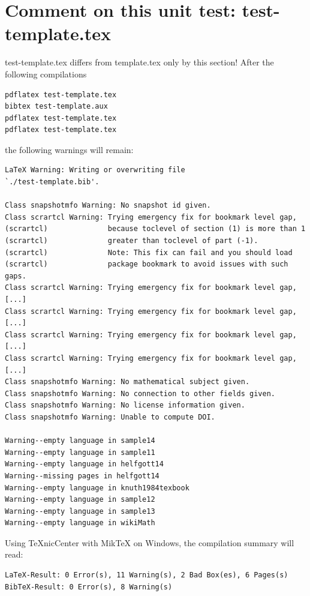 \documentclass{snapshotmfo}
\begin{document}
\section{Comment on this unit test: test-template.tex}
test-template.tex differs from template.tex only by this section!
After the following compilations
\begin{small}
\begin{verbatim}
pdflatex test-template.tex
bibtex test-template.aux
pdflatex test-template.tex
pdflatex test-template.tex
\end{verbatim}
\end{small}
the following warnings will remain:
\begin{small}
\begin{verbatim}
LaTeX Warning: Writing or overwriting file
`./test-template.bib'.

Class snapshotmfo Warning: No snapshot id given.
Class scrartcl Warning: Trying emergency fix for bookmark level gap,
(scrartcl)              because toclevel of section (1) is more than 1
(scrartcl)              greater than toclevel of part (-1).
(scrartcl)              Note: This fix can fail and you should load
(scrartcl)              package bookmark to avoid issues with such gaps.
Class scrartcl Warning: Trying emergency fix for bookmark level gap,
[...]
Class scrartcl Warning: Trying emergency fix for bookmark level gap,
[...]
Class scrartcl Warning: Trying emergency fix for bookmark level gap,
[...]
Class scrartcl Warning: Trying emergency fix for bookmark level gap,
[...]
Class snapshotmfo Warning: No mathematical subject given.
Class snapshotmfo Warning: No connection to other fields given.
Class snapshotmfo Warning: No license information given.
Class snapshotmfo Warning: Unable to compute DOI.

Warning--empty language in sample14
Warning--empty language in sample11
Warning--empty language in helfgott14
Warning--missing pages in helfgott14
Warning--empty language in knuth1984texbook
Warning--empty language in sample12
Warning--empty language in sample13
Warning--empty language in wikiMath
\end{verbatim}
\end{small}

Using TeXnicCenter with MikTeX on Windows, the compilation summary will read:
\begin{small}
\begin{verbatim}
LaTeX-Result: 0 Error(s), 11 Warning(s), 2 Bad Box(es), 6 Pages(s)
BibTeX-Result: 0 Error(s), 8 Warning(s)
\end{verbatim}
\end{small}
\end{document}
